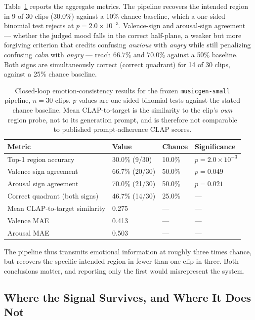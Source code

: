 \documentclass[11pt]{article}
\begin{document}
Table~\ref{tab:results} reports the aggregate metrics. The pipeline recovers the intended region in 9 of 30 clips (30.0\%) against a 10\% chance baseline, which a one-sided binomial test rejects at $p = 2.0 \times 10^{-3}$. Valence-sign and arousal-sign agreement --- whether the judged mood falls in the correct half-plane, a weaker but more forgiving criterion that credits confusing \emph{anxious} with \emph{angry} while still penalizing confusing \emph{calm} with \emph{angry} --- reach 66.7\% and 70.0\% against a 50\% baseline. Both signs are simultaneously correct (correct quadrant) for 14 of 30 clips, against a 25\% chance baseline.

\begin{table}[t]
\centering
\caption{Closed-loop emotion-consistency results for the frozen \texttt{musicgen-small} pipeline, $n = 30$ clips. $p$-values are one-sided binomial tests against the stated chance baseline. Mean CLAP-to-target is the similarity to the clip's \emph{own} region probe, not to its generation prompt, and is therefore not comparable to published prompt-adherence CLAP scores.}
\label{tab:results}
\small
\begin{tabular}{@{}p{5.4cm}p{2.0cm}p{2.0cm}p{3.0cm}@{}}
\toprule
Metric & Value & Chance & Significance \\
\midrule
Top-1 region accuracy & 30.0\% (9/30) & 10.0\% & $p = 2.0\times10^{-3}$ \\
Valence sign agreement & 66.7\% (20/30) & 50.0\% & $p = 0.049$ \\
Arousal sign agreement & 70.0\% (21/30) & 50.0\% & $p = 0.021$ \\
Correct quadrant (both signs) & 46.7\% (14/30) & 25.0\% & --- \\
Mean CLAP-to-target similarity & 0.275 & --- & --- \\
Valence MAE & 0.413 & --- & --- \\
Arousal MAE & 0.503 & --- & --- \\
\bottomrule
\end{tabular}
\end{table}

The pipeline thus transmits emotional information at roughly three times chance, but recovers the specific intended region in fewer than one clip in three. Both conclusions matter, and reporting only the first would misrepresent the system.

\subsection{Where the Signal Survives, and Where It Does Not}
\end{document}
